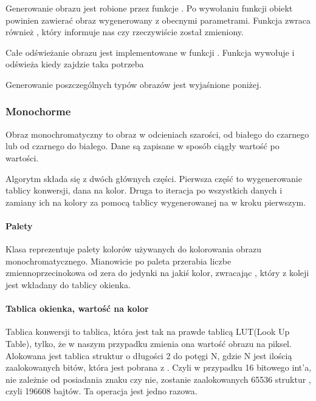 Generowanie obrazu jest robione przez funkcje .
Po wywołaniu funkcji obiekt  powinien zawierać obraz wygenerowany z obecnymi parametrami.
Funkcja zwraca również , który informuje nas czy  rzeczywiście został zmieniony.

Całe odświeżanie obrazu jest implementowane w funkcji .
Funkcja wywołuje  i odświeża  kiedy zajdzie taka potrzeba

Generowanie poszczególnych typów obrazów jest wyjaśnione poniżej.

\subsubsection{Monochorme}

Obraz monochromatyczny to obraz w odcieniach szarości, od białego do czarnego lub od czarnego do białego. Dane są zapisane w sposób ciągły wartość po wartości.

Algorytm składa się z dwóch głównych części.
Pierwsza część to wygenerowanie tablicy konwersji, dana na kolor.
Druga to iteracja po wszystkich danych i zamiany ich na kolory za pomocą tablicy wygenerowanej na w kroku pierwszym.

\paragraph{Palety} 
Klasa  reprezentuje palety kolorów używanych do kolorowania obrazu monochromatycznego.
Mianowicie po paleta przerabia liczbe zmiennoprzecinokowa od zera do jedynki na jakiś kolor, zwracając , który z koleji jest wkładany do tablicy okienka.

\paragraph{Tablica okienka, wartość na kolor}

Tablica konwersji to tablica, która jest tak na prawde tablicą LUT(Look Up Table), tylko, że w naszym przypadku zmienia ona wartość obrazu na piksel.
Alokowana jest tablica struktur  o długości 2 do potęgi N, gdzie N jest ilością zaalokowanych bitów, która jest pobrana z .
Czyli w przypadku 16 bitowego int'a, nie zależnie od posiadania znaku czy nie, zostanie zaalokowanych 65536 struktur , czyli 196608 bajtów.
Ta operacja jest jedno razowa.

